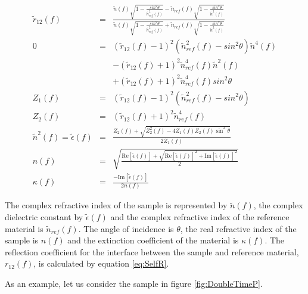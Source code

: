 \begin{eqnarray}
\widetilde{r}_{12}(f) &=& \frac{\widetilde{n}(f)\sqrt{1-\frac{sin^{2}{\theta}}{\widetilde{n}^{2}_{ref}(f)}} - \widetilde{n}_{ref}(f)\sqrt{1-\frac{sin^{2}{\theta}}{\widetilde{n}^{2}(f)}}}{\widetilde{n}(f)\sqrt{1-\frac{sin^{2}{\theta}}{\widetilde{n}^{2}_{ref}(f)}} + \widetilde{n}_{ref}(f)\sqrt{1-\frac{sin^{2}{\theta}}{\widetilde{n}^{2}(f)}}}\\
0 &=& (\widetilde{r}_{12}(f)-1)^{2}(\widetilde{n}^{2}_{ref}(f)-sin^{2}{\theta})\widetilde{n}^{4}(f)\nonumber\\
& & -(\widetilde{r}_{12}(f)+1)^{2}\widetilde{n}^{4}_{ref}(f)\widetilde{n}^{2}(f)\nonumber\\
& & +(\widetilde{r}_{12}(f)+1)^{2}\widetilde{n}^{4}_{ref}(f)sin^{2}{\theta}\\
Z_{1}(f) &=& (\widetilde{r}_{12}(f)-1)^{2}(\widetilde{n}^{2}_{ref}(f)-sin^{2}{\theta})\\
Z_{2}(f) &=& (\widetilde{r}_{12}(f)+1)^{2}\widetilde{n}^{4}_{ref}(f)\\
\widetilde{n}^{2}(f) = \widetilde{\epsilon}(f) &=& \frac{Z_{2}(f) + \sqrt{Z_{2}^{2}(f) - 4Z_{1}(f)Z_{2}(f)\sin^{2}{\theta}}}{2Z_{1}(f)}\\
n(f) &=& \sqrt{\frac{\text{Re}[\widetilde{\epsilon}(f)] + \sqrt{\text{Re}[\widetilde{\epsilon}(f)]^{2} + \text{Im}[\widetilde{\epsilon}(f)]^{2}}}{2}}\\
\kappa(f) &=& \frac{-\text{Im}[\widetilde{\epsilon}(f)]}{2n(f)}
\label{eq:Selfext}
\end{eqnarray}

The complex refractive index of the sample is represented by $\widetilde{n}(f)$, the complex dielectric constant by $\widetilde{\epsilon}(f)$ and the complex refractive index of the reference material is $\widetilde{n}_{ref}(f)$. The angle of incidence is $\theta$, the real refractive index of the sample is $n (f)$ and the extinction coefficient of the material is $\kappa (f)$. The reflection coefficient for the interface between the sample and reference material, $r_{12}(f)$, is calculated by equation \ref{eq:SelfR}.

As an example, let us consider the sample in figure \ref{fig:DoubleTimeP}.

